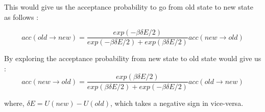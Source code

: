 \documentclass{article}
\begin{document}
This would give us the acceptance probability to go from old state to new state as follows : 

\begin{equation}
\boxed{acc(old \rightarrow new) = \frac{exp(-\beta \delta E/2)}{exp(-\beta \delta E/2) + exp(\beta \delta E/2)} acc(new \rightarrow old)}
\end{equation}

By exploring the acceptance probability from new state to old state would give us :
\begin{equation}
\boxed{acc(new \rightarrow old) = \frac{exp( \beta \delta E/2)}{exp(\beta \delta E/2) + exp(-\beta \delta E/2)} acc(old \rightarrow new)}
\end{equation}

where, $\delta E = U(new) - U(old)$, which takes a negative sign in vice-versa.
\end{document}
